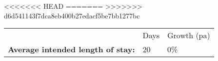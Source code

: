 <<<<<<< HEAD
=======
>>>>>>> d6d541143f7dca8eb400b27edacf5be7bb1277bc
\begin{tabular}[t]{p{4.45cm}>{\hfill}p{1.3cm}>{\hfill}p{1.7cm}}
   & Days & Growth (pa) \\ 
 \textbf{Average intended length of stay:} & 20 & 0\% \\ 
  \end{tabular}
